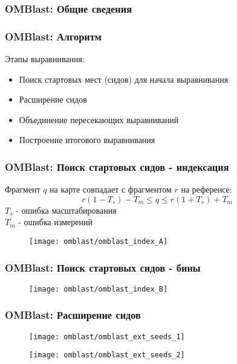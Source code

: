 \begin{frame}
\frametitle{OMBlast: Общие сведения}

\end{frame}

\begin{frame}
\frametitle{OMBlast: Алгоритм}

Этапы выравнивания:
\begin{itemize}
  \item Поиск стартовых мест (сидов) для начала выравнивания
  \item Расширение сидов
  \item Объединение пересекающих выравниваний
  \item Построение итогового выравнивания
\end{itemize}

\end{frame}

\begin{frame}
\frametitle{OMBlast: Поиск стартовых сидов - индексация}
  Фрагмент $q$ на карте совпадает с фрагментом $r$ на референсе:
  \begin{equation*}
    r(1 - T_s) - T_m \le q \le r(1 + T_s) + T_m
  \end{equation*}
  $T_s$ - ошибка масштабирования \\
  $T_m$ - ошибка измерений \\
  \begin{figure}
    \centering
    \texttt{[image: omblast/omblast\_index\_A]}
  \end{figure}
\end{frame}

\begin{frame}
\frametitle{OMBlast: Поиск стартовых сидов - бины}
  \begin{figure}
    \centering
    \texttt{[image: omblast/omblast\_index\_B]}
  \end{figure}
\end{frame}

\begin{frame}
\frametitle{OMBlast: Расширение сидов}
  \begin{figure}
    \centering
    \texttt{[image: omblast/omblast\_ext\_seeds\_1]}
  \end{figure}
  \begin{figure}
    \centering
    \texttt{[image: omblast/omblast\_ext\_seeds\_2]}
  \end{figure}
\end{frame}

